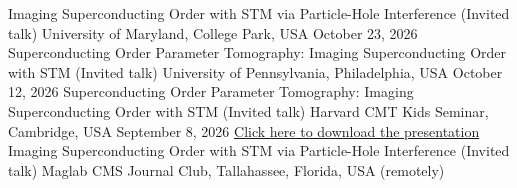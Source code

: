 

\begin{cventries}

\cventry
{} %
{Imaging Superconducting Order with STM via Particle-Hole Interference (Invited talk)} %
{University of Maryland, College Park, USA} %
{October 23, 2026} %
{
}
\vspace{-1.5mm}
	\cventry
	{} %
	{Superconducting Order Parameter Tomography: Imaging Superconducting Order with STM (Invited talk)} %
	{University of Pennsylvania, Philadelphia, USA} %
	{October 12, 2026} %
	{
	}
	\vspace{-1.5mm}
\cventry
{} %
{Superconducting Order Parameter Tomography: Imaging Superconducting Order with STM (Invited talk)} %
{Harvard CMT Kids Seminar, Cambridge, USA} %
{September 8, 2026} %
{
}
\vspace{-1.5mm}
	\cventry
{\href{https://docs.google.com/presentation/d/1C0MD8s13WkFd5vLBB45GIYMHfWi9kn8X/edit?usp=sharing&ouid=105264388550874489858&rtpof=true&sd=true}{Click \underline{here} to download the presentation}} %
{Imaging Superconducting Order with STM via Particle-Hole Interference (Invited talk)} %
{Maglab CMS Journal Club, Tallahassee, Florida, USA (remotely)} %

\end{cventries}
